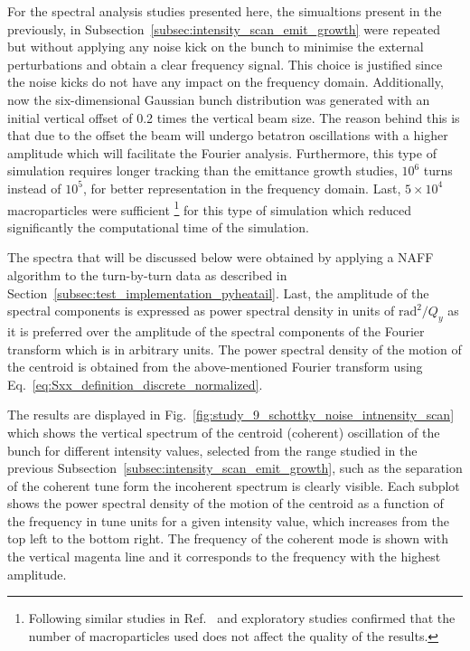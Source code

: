 For the spectral analysis studies presented here, the simualtions present in the previously, in Subsection~\ref{subsec:intensity_scan_emit_growth} were repeated but without applying any noise kick on the bunch to minimise the external perturbations and obtain a clear frequency signal. This choice is justified since the noise kicks do not have any impact on the frequency domain. Additionally, now the six-dimensional Gaussian bunch distribution was generated with an initial vertical offset of 0.2 times the vertical beam size. The reason behind this is that due to the offset the beam will undergo betatron oscillations with a higher amplitude which will facilitate the Fourier analysis. Furthermore, this type of simulation requires longer tracking than the emittance growth studies, $10^6$ turns instead of $10^5$, for better representation in the frequency domain. Last, $5 \times 10^4$ macroparticles were sufficient \footnote{Following similar studies in Ref.~\cite{Zorzano-Mier:446334} and exploratory studies confirmed that the number of macroparticles used does not affect the quality of the results.} for this type of simulation which reduced significantly the computational time of the simulation. 

The spectra that will be discussed below were obtained by applying a NAFF algorithm to the turn-by-turn data as described in Section~\ref{subsec:test_implementation_pyheatail}. Last, the amplitude of the spectral components is expressed as power spectral density in units of $\mathrm{rad^2}/Q_y$ as it is preferred over the amplitude of the spectral components of the Fourier transform which is in arbitrary units. The power spectral density of the motion of the centroid is obtained from the above-mentioned Fourier transform using Eq.~\eqref{eq:Sxx_definition_discrete_normalized}.

The results are displayed in Fig.~\ref{fig:study_9_schottky_noise_intnensity_scan} which shows the vertical spectrum of the centroid (coherent) oscillation of the bunch for different intensity values, selected from the range studied in the previous Subsection~\ref{subsec:intensity_scan_emit_growth}, such as the separation of the coherent tune form the incoherent spectrum is clearly visible. Each subplot shows the power spectral density of the motion of the centroid as a function of the frequency in tune units for a given intensity value, which increases from the top left to the bottom right. The frequency of the coherent mode is shown with the vertical magenta line and it corresponds to the frequency with the highest amplitude.

